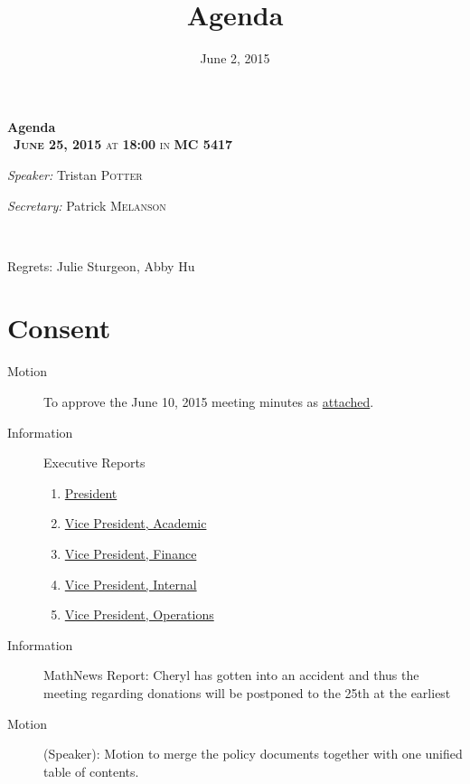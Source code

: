 \documentclass[12pt, letterpaper]{article}
\title{Agenda}
\date{June 2, 2015}
\newcommand{\meetingDate}{June 25, 2015}
\newcommand{\meetingTime}{18:00}
\newcommand{\meetingLocation}{MC 5417}
\begin{document}
\hypersetup{} %


\begin{center}
{ \huge \bfseries Agenda \\[0.4cm] }
{\textsc{~\textbf{\meetingDate} at \textbf{\meetingTime} in \textbf{\meetingLocation}}}
\\[0.2cm]

\begin{minipage}[t]{0.5\textwidth}
\begin{flushleft} \large
\emph{Speaker:}
Tristan \textsc{Potter}
\end{flushleft}
\end{minipage}%
\begin{minipage}[t]{0.5\textwidth}
\begin{flushright} \large
\emph{Secretary:} 
Patrick \textsc{Melanson}
\end{flushright}
\end{minipage}

\HRule \\[0.4cm]
\end{center}

Regrets: Julie Sturgeon, Abby Hu
\section*{Consent}
\begin{description}
	\item[Motion] To approve the June 10, 2015 meeting minutes as \hyperref[minutes]{attached}.
	\item[Information] Executive Reports
	\begin{enumerate}
		\item \hyperref[president]{President}
		\item \hyperref[vpacademic]{Vice President, Academic}
		\item \hyperref[vpfinance]{Vice President, Finance}
		\item \hyperref[vpinternal]{Vice President, Internal}
		\item \hyperref[vpoperations]{Vice President, Operations}
	\end{enumerate}
	\item[Information] MathNews Report: Cheryl has gotten into an accident and thus the meeting regarding donations will be postponed to the 25th at the earliest
	\item[Motion] (Speaker): Motion to merge the policy documents together with one unified table of contents. 
\end{description}
\HRule
\end{document}
